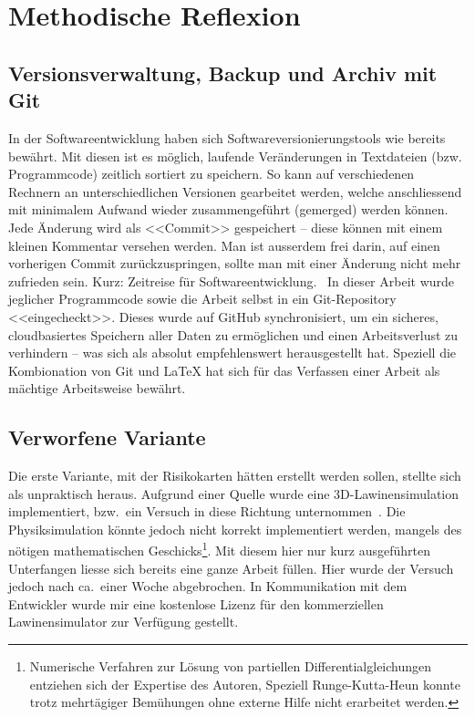 \clearpage
{}
\section{Methodische Reflexion}
\subsection{Versionsverwaltung, Backup und Archiv mit Git}

In der Softwareentwicklung haben sich Softwareversionierungstools wie  bereits bewährt. Mit diesen ist es möglich, laufende Veränderungen in Textdateien (bzw. Programmcode) zeitlich sortiert zu speichern. So kann auf verschiedenen Rechnern an unterschiedlichen Versionen gearbeitet werden, welche anschliessend mit minimalem Aufwand wieder zusammengeführt (gemerged) werden können. Jede Änderung wird als <<Commit>> gespeichert -- diese können mit einem kleinen Kommentar versehen werden. Man ist ausserdem frei darin, auf einen vorherigen Commit zurückzuspringen, sollte man mit einer Änderung nicht mehr zufrieden sein. Kurz: Zeitreise für Softwareentwicklung.~\cite{chacon2014pro}
In dieser Arbeit wurde jeglicher Programmcode sowie die Arbeit selbst in ein Git-Repository <<eingecheckt>>. Dieses wurde auf GitHub synchronisiert, um ein sicheres, cloudbasiertes Speichern aller Daten zu ermöglichen und einen Arbeitsverlust zu verhindern -- was sich als absolut empfehlenswert herausgestellt hat. Speziell die Kombionation von Git und LaTeX hat sich für das Verfassen einer Arbeit als mächtige Arbeitsweise bewährt.

\subsection{Verworfene Variante}

Die erste Variante, mit der Risikokarten hätten erstellt werden sollen, stellte sich als unpraktisch heraus. Aufgrund einer Quelle wurde eine 3D-Lawinensimulation implementiert, bzw.\ ein Versuch in diese Richtung unternommen\ \cite{athmaps}. Die Physiksimulation könnte jedoch nicht korrekt implementiert werden, mangels des nötigen mathematischen Geschicks\footnote{Numerische Verfahren zur Lösung von partiellen Differentialgleichungen entziehen sich der Expertise des Autoren, Speziell Runge-Kutta-Heun konnte trotz mehrtägiger Bemühungen ohne externe Hilfe nicht erarbeitet werden.}. Mit diesem hier nur kurz ausgeführten Unterfangen liesse sich bereits eine ganze Arbeit füllen. Hier wurde der Versuch jedoch nach ca.\ einer Woche abgebrochen. In Kommunikation mit dem Entwickler wurde mir eine kostenlose Lizenz für den kommerziellen Lawinensimulator  zur Verfügung gestellt.

